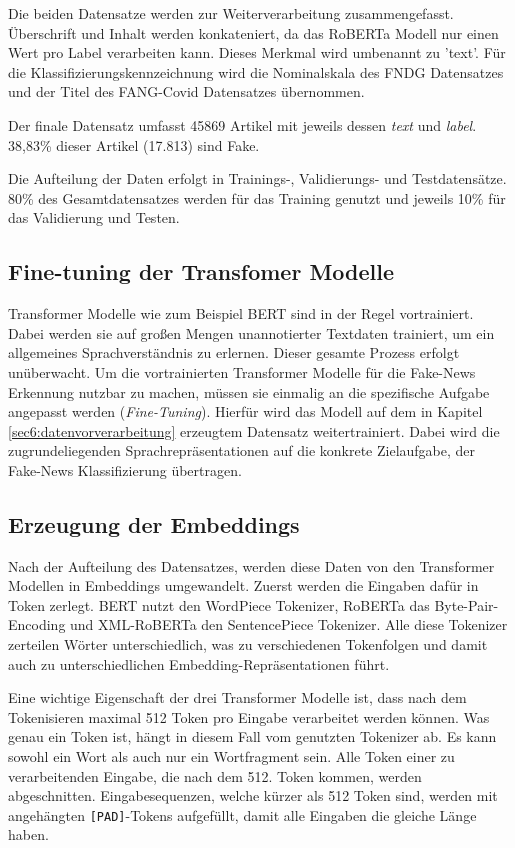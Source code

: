 Die beiden Datensatze werden zur Weiterverarbeitung zusammengefasst. Überschrift und Inhalt werden konkateniert, da das RoBERTa Modell nur
einen Wert pro Label verarbeiten kann. Dieses Merkmal wird umbenannt zu 'text'. 
Für die Klassifizierungskennzeichnung wird die Nominalskala des FNDG Datensatzes und der Titel des FANG-Covid Datensatzes übernommen.

Der finale Datensatz umfasst 45869 Artikel mit jeweils dessen \textit{text} und \textit{label}.
38,83\% dieser Artikel (17.813) sind Fake. 

Die Aufteilung der Daten erfolgt in Trainings-, Validierungs- und Testdatensätze. 
80\% des Gesamtdatensatzes werden für das Training genutzt und jeweils 10\% für das Validierung und Testen.

\subsection{Fine-tuning der Transfomer Modelle}

Transformer Modelle wie zum Beispiel BERT sind in der Regel vortrainiert. Dabei werden sie auf großen Mengen unannotierter Textdaten trainiert, um ein allgemeines Sprachverständnis 
zu erlernen. Dieser gesamte Prozess erfolgt unüberwacht.
Um die vortrainierten Transformer Modelle für die Fake-News Erkennung nutzbar zu machen, müssen sie einmalig an die spezifische Aufgabe angepasst werden (\textit{Fine-Tuning}).
Hierfür wird das Modell auf dem in Kapitel \ref{sec6:datenvorverarbeitung} erzeugtem Datensatz weitertrainiert. Dabei wird die zugrundeliegenden Sprachrepräsentationen auf 
die konkrete Zielaufgabe, der Fake-News Klassifizierung übertragen.

\subsection{Erzeugung der Embeddings}

Nach der Aufteilung des Datensatzes, werden diese Daten von den Transformer Modellen in Embeddings umgewandelt.
Zuerst werden die Eingaben dafür in Token zerlegt.
BERT nutzt den WordPiece Tokenizer, RoBERTa das Byte-Pair-Encoding und XML-RoBERTa den SentencePiece Tokenizer.
Alle diese Tokenizer zerteilen Wörter unterschiedlich, was zu verschiedenen Tokenfolgen und damit auch zu unterschiedlichen Embedding-Repräsentationen führt.

Eine wichtige Eigenschaft der drei Transformer Modelle ist, dass nach dem Tokenisieren maximal 512 Token pro Eingabe verarbeitet werden können.
Was genau ein Token ist, hängt in diesem Fall vom genutzten Tokenizer ab. Es kann sowohl ein Wort als auch nur ein Wortfragment sein.
Alle Token einer zu verarbeitenden Eingabe, die nach dem 512. Token kommen, werden abgeschnitten.
Eingabesequenzen, welche kürzer als 512 Token sind, werden mit angehängten \texttt{[PAD]}-Tokens aufgefüllt, damit alle Eingaben die gleiche Länge haben.

